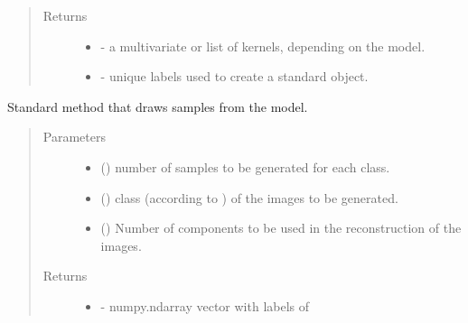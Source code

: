 \documentclass[letterpaper,10pt,english]{sphinxmanual}
\begin{document}
\begin{fulllineitems}
\begin{fulllineitems}
\begin{quote}
\begin{description}
\item[{Returns}] \leavevmode
\begin{itemize}
\item {} 
 - a multivariate  or list of kernels,             depending on the model.

\item {} 
 - unique labels used to create a standard object.

\end{itemize}


\end{description}\end{quote}

\end{fulllineitems}


\begin{fulllineitems}
\label{\detokenize{api:brainSimulator.BrainSimulator.sample}}
Standard method that draws samples from the model.
\begin{quote}\begin{description}
\item[{Parameters}] \leavevmode\begin{itemize}
\item {} 
 () \textendash{} number of samples to be generated for each class.

\item {} 
 () \textendash{} class (according to ) of the images to         be generated.

\item {} 
 () \textendash{} Number of components to be used in the         reconstruction of the images.

\end{itemize}

\item[{Returns}] \leavevmode
\begin{itemize}
\item {} 
 - numpy.ndarray vector with  labels of 


\end{itemize}
\end{description}
\end{quote}
\end{fulllineitems}
\end{fulllineitems}
\end{document}
